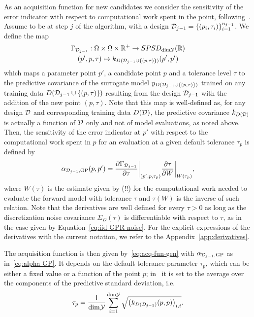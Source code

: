 As an acquisition function for new candidates we consider the sensitivity of the error indicator with respect to computational work spent in the point, following~\cite{SemlerWeiser2024,VillaniUngerWeiser2024}.\newline
Assume to be at step $j$ of the algorithm, with a design $\mathcal D_{j-1} = \{ (p_i, \tau_i) \}_{i=1}^{n_{j-1}}$.
We define the map 
\begin{gather*}
    \Gamma_{\mathcal D_{j-1}} : \Omega \times \Omega \times \mathbb{R}^+ \to SPSD_{\text{dim}\mathcal Y}(\mathbb{R}) \\
    (p', p, \tau) \mapsto k_{D(\mathcal D_{j-1} \cup \{(p, \tau)\}) }(p',p')
\end{gather*}
which maps a parameter point $p'$, a candidate point $p$ and a tolerance level $\tau$ to the predictive covariance of the surrogate model $y_{D(\mathcal D_{j-1} \cup \{(p, \tau)\}) }$ trained on any training data $D(\mathcal D_{j-1} \cup \{(p, \tau)\})$  resulting from the design $\mathcal D_{j-1}$ with the addition of the new point $(p, \tau)$.
Note that this map is well-defined as, for any design $\mathcal D$ and corresponding training data $D(\mathcal D)$, the predictive covariance $k_{D(\mathcal D)}$ is actually a function of $\mathcal D$ only and not of model evaluations, as noted above.\newline
Then, the sensitivity of the error indicator at $p'$ with respect to the computational work spent in $p$ for an evaluation at a given default tolerance $\tau_p$ is defined by
\begin{equation} \label{eq:alpha-GP}
    \alpha_{\mathcal D_{j-1}, \text{GP}}(p, p') = \frac{\partial \Gamma_{\mathcal D_{j-1}}}{\partial \tau} \bigg |_{(p',p,\tau_p)} \frac{\partial \tau}{\partial W}\bigg |_{W(\tau_p)},
\end{equation}
where $W(\tau)$ is the estimate given by (!!) for the computational work needed to evaluate the forward model with tolerance $\tau$ and $\tau(W)$ is the inverse of such relation. \newline
Note that the derivatives are well defined for every $\tau >0$ as long as the discretization noise covariance $\Sigma_D(\tau)$ is differentiable with respect to $\tau$, as in the case given by Equation~\eqref{eq:iid-GPR-noise}. 
For the explicit expressions of the derivatives with the current notation, we refer to the Appendix~\ref{app:derivatives}.

The acquisition function is then given by~\eqref{eq:acq-fun-gen} with $\alpha_{\mathcal D_{j-1},\text{GP}}$ as in~\eqref{eq:alpha-GP}. 
It depends on the default tolerance parameter $\tau_p$, which can be either a fixed value or a function of the point $p$; in~\cite{VillaniUngerWeiser2024} it is set to the average over the components of the predictive standard deviation, i.e.
\[ \tau_p = \frac{1}{\text{dim}\mathcal Y} \sum_{i=1}^{\text{dim}\mathcal Y} \sqrt{ \big (k_{D(\mathcal D_{j-1})}(p,p) \big )_{i,i}}. \]  \medbreak

